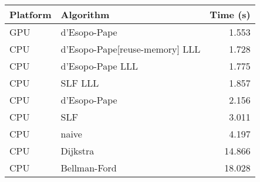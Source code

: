 \begin{tabular}{llr}
  \hline
  Platform & Algorithm & Time (s) \\
  \hline
  GPU & d'Esopo-Pape & 1.553 \\
  CPU & d'Esopo-Pape[reuse-memory] LLL & 1.728 \\
  CPU & d'Esopo-Pape LLL & 1.775 \\
  CPU & SLF LLL & 1.857 \\
  CPU & d'Esopo-Pape & 2.156 \\
  CPU & SLF & 3.011 \\
  CPU & naive & 4.197 \\
  CPU & Dijkstra & 14.866 \\
  CPU & Bellman-Ford & 18.028 \\
  \hline
\end{tabular}

